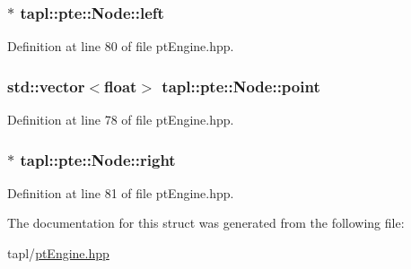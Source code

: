 \subsubsection[{\texorpdfstring{left}{left}}]{$\ast$ tapl\+::pte\+::\+Node\+::left}\hypertarget{structtapl_1_1pte_1_1Node_afaef86b1bf78932339871f61ad88535b}{}\label{structtapl_1_1pte_1_1Node_afaef86b1bf78932339871f61ad88535b}


Definition at line 80 of file pt\+Engine.\+hpp.

\subsubsection[{\texorpdfstring{point}{point}}]{\setlength{\rightskip}{0pt plus 5cm}std\+::vector$<$float$>$ tapl\+::pte\+::\+Node\+::point}\hypertarget{structtapl_1_1pte_1_1Node_a8b3448deee1ff9e0c9873b25ee83dd23}{}\label{structtapl_1_1pte_1_1Node_a8b3448deee1ff9e0c9873b25ee83dd23}


Definition at line 78 of file pt\+Engine.\+hpp.

\subsubsection[{\texorpdfstring{right}{right}}]{$\ast$ tapl\+::pte\+::\+Node\+::right}\hypertarget{structtapl_1_1pte_1_1Node_ab68a326fa1516aa082032dfd05065dd9}{}\label{structtapl_1_1pte_1_1Node_ab68a326fa1516aa082032dfd05065dd9}


Definition at line 81 of file pt\+Engine.\+hpp.



The documentation for this struct was generated from the following file\+:\begin{DoxyCompactItemize}
\item 
tapl/\hyperlink{ptEngine_8hpp}{pt\+Engine.\+hpp}\end{DoxyCompactItemize}
